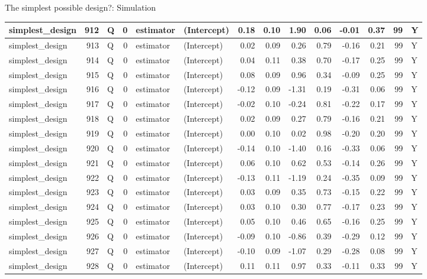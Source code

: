 \documentclass[
  11pt,
  ignorenonframetext,
]{beamer}
\begin{document}
\begin{frame}[fragile]{The simplest possible design?: Simulation}
\begin{tabular}{l|r|l|r|l|l|r|r|r|r|r|r|r|l}
\hline
simplest\_design & 912 & Q & 0 & estimator & (Intercept) & 0.18 & 0.10 & 1.90 & 0.06 & -0.01 & 0.37 & 99 & Y\\
\hline
simplest\_design & 913 & Q & 0 & estimator & (Intercept) & 0.02 & 0.09 & 0.26 & 0.79 & -0.16 & 0.21 & 99 & Y\\
\hline
simplest\_design & 914 & Q & 0 & estimator & (Intercept) & 0.04 & 0.11 & 0.38 & 0.70 & -0.17 & 0.25 & 99 & Y\\
\hline
simplest\_design & 915 & Q & 0 & estimator & (Intercept) & 0.08 & 0.09 & 0.96 & 0.34 & -0.09 & 0.25 & 99 & Y\\
\hline
simplest\_design & 916 & Q & 0 & estimator & (Intercept) & -0.12 & 0.09 & -1.31 & 0.19 & -0.31 & 0.06 & 99 & Y\\
\hline
simplest\_design & 917 & Q & 0 & estimator & (Intercept) & -0.02 & 0.10 & -0.24 & 0.81 & -0.22 & 0.17 & 99 & Y\\
\hline
simplest\_design & 918 & Q & 0 & estimator & (Intercept) & 0.02 & 0.09 & 0.27 & 0.79 & -0.16 & 0.21 & 99 & Y\\
\hline
simplest\_design & 919 & Q & 0 & estimator & (Intercept) & 0.00 & 0.10 & 0.02 & 0.98 & -0.20 & 0.20 & 99 & Y\\
\hline
simplest\_design & 920 & Q & 0 & estimator & (Intercept) & -0.14 & 0.10 & -1.40 & 0.16 & -0.33 & 0.06 & 99 & Y\\
\hline
simplest\_design & 921 & Q & 0 & estimator & (Intercept) & 0.06 & 0.10 & 0.62 & 0.53 & -0.14 & 0.26 & 99 & Y\\
\hline
simplest\_design & 922 & Q & 0 & estimator & (Intercept) & -0.13 & 0.11 & -1.19 & 0.24 & -0.35 & 0.09 & 99 & Y\\
\hline
simplest\_design & 923 & Q & 0 & estimator & (Intercept) & 0.03 & 0.09 & 0.35 & 0.73 & -0.15 & 0.22 & 99 & Y\\
\hline
simplest\_design & 924 & Q & 0 & estimator & (Intercept) & 0.03 & 0.10 & 0.30 & 0.77 & -0.17 & 0.23 & 99 & Y\\
\hline
simplest\_design & 925 & Q & 0 & estimator & (Intercept) & 0.05 & 0.10 & 0.46 & 0.65 & -0.16 & 0.25 & 99 & Y\\
\hline
simplest\_design & 926 & Q & 0 & estimator & (Intercept) & -0.09 & 0.10 & -0.86 & 0.39 & -0.29 & 0.12 & 99 & Y\\
\hline
simplest\_design & 927 & Q & 0 & estimator & (Intercept) & -0.10 & 0.09 & -1.07 & 0.29 & -0.28 & 0.08 & 99 & Y\\
\hline
simplest\_design & 928 & Q & 0 & estimator & (Intercept) & 0.11 & 0.11 & 0.97 & 0.33 & -0.11 & 0.33 & 99 & Y\\

\end{tabular}
\end{frame}
\end{document}
